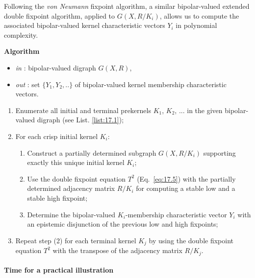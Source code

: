 Following the \emph{von Neumann} fixpoint algorithm, a similar bipolar-valued extended double fixpoint algorithm, applied to $G(X,R/K_i)$, allows us to compute the associated bipolar-valued kernel characteristic vectors $Y_i$ in polynomial complexity.

\noindent \textbf{Algorithm} 
\begin{itemize}
 \item [] \emph{in} : bipolar-valued digraph $G(X,R)$,
 \item [] \emph{out} : set $\{Y_1, Y_2, .. \}$ of bipolar-valued kernel membership characteristic vectors.
\end{itemize}
\begin{enumerate}
\item Enumerate all initial and terminal prekernels $K_1$, $K_2$, ... in the given bipolar-valued digraph (see List. \ref{list:17.1});
\item For each crisp initial kernel $K_i$:
  \begin{enumerate}
  \item Construct a partially determined subgraph $G(X,R/K_i)$ supporting exactly this unique initial kernel $K_i$;
  \item Use the double fixpoint equation $T^2$ (Eq.~\ref{eq:17.5}) with the partially determined adjacency matrix $R/K_i$ for computing a stable low and a stable high fixpoint;
   \item Determine the bipolar-valued $K_i$-membership characteristic vector $Y_i$ with an epistemic disjunction of the previous low and high fixpoints;
  \end{enumerate}
\item Repeat step (2) for each terminal kernel $K_j$ by using the double fixpoint equation $T^2$ with the transpose of the adjacency matrix $R/K_j$.
\end{enumerate}

\paragraph{\textbf{Time for a practical illustration}}

